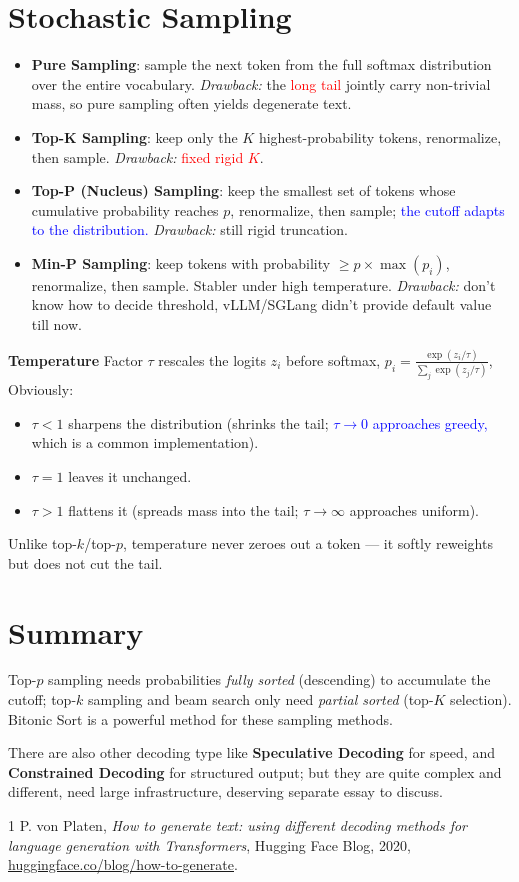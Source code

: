 \documentclass{article}
\begin{document}
\section{Stochastic Sampling}
\begin{itemize}
    \item \textbf{Pure Sampling}: sample the next token from the full softmax distribution over the entire vocabulary. \emph{Drawback:} the \textcolor{red}{long tail} jointly carry non-trivial mass, so pure sampling often yields degenerate text.
    \item \textbf{Top-K Sampling}: keep only the $K$ highest-probability tokens, renormalize, then sample. \emph{Drawback:} \textcolor{red}{fixed rigid $K$}.
    \item \textbf{Top-P (Nucleus) Sampling}: keep the smallest set of tokens whose cumulative probability reaches $p$, renormalize, then sample; \textcolor{blue}{the cutoff adapts to the distribution.} \emph{Drawback:} still rigid truncation.
    \item \textbf{Min-P Sampling}: keep tokens with probability $\ge p\times \max(p_i)$, renormalize, then sample. Stabler under high temperature. \emph{Drawback:} don't know how to decide threshold, vLLM/SGLang didn't provide default value till now.
\end{itemize}

\textbf{Temperature} Factor $\tau$ rescales the logits $z_i$ before softmax, $p_i = \frac{\exp(z_i/\tau)}{\sum_{j}\exp(z_j/\tau)}$, Obviously:
\begin{itemize}
    \item $\tau < 1$ sharpens the distribution (shrinks the tail; \textcolor{blue}{$\tau \to 0$ approaches greedy,} which is a common implementation).
    \item $\tau = 1$ leaves it unchanged.
    \item $\tau > 1$ flattens it (spreads mass into the tail; $\tau \to \infty$ approaches uniform).
\end{itemize}
Unlike top-$k$/top-$p$, temperature never zeroes out a token --- it softly reweights but does not cut the tail.

\section{Summary}
Top-$p$ sampling needs probabilities \emph{fully sorted} (descending) to accumulate the cutoff; top-$k$ sampling and beam search only need \emph{partial sorted} (top-$K$ selection). Bitonic Sort is a powerful method for these sampling methods.

There are also other decoding type like \textbf{Speculative Decoding} for speed, and \textbf{Constrained Decoding} for structured output; but they are quite complex and different, need large infrastructure, deserving separate essay to discuss.

\begin{thebibliography}{1}
    P. von Platen, \emph{How to generate text: using different decoding methods for language generation with Transformers}, Hugging Face Blog, 2020, \href{https://huggingface.co/blog/how-to-generate}{huggingface.co/blog/how-to-generate}.
\end{thebibliography}
\end{document}
